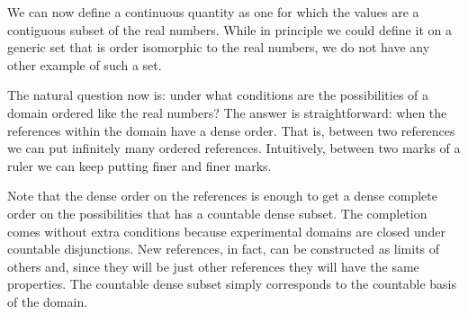 \documentclass[11pt,letterpaper,fleqn]{memoir} %
\begin{document}
We can now define a continuous quantity as one for which the values are a contiguous subset of the real numbers. While in principle we could define it on a generic set that is order isomorphic to the real numbers, we do not have any other example of such a set.

The natural question now is: under what conditions are the possibilities of a domain ordered like the real numbers? The answer is straightforward: when the references within the domain have a dense order. That is, between two references we can put infinitely many ordered references. Intuitively, between two marks of a ruler we can keep putting finer and finer marks.

Note that the dense order on the references is enough to get a dense complete order on the possibilities that has a countable dense subset. The completion comes without extra conditions because experimental domains are closed under countable disjunctions. New references, in fact, can be constructed as limits of others and, since they will be just other references they will have the same properties. The countable dense subset simply corresponds to the countable basis of the domain.
\end{document}
